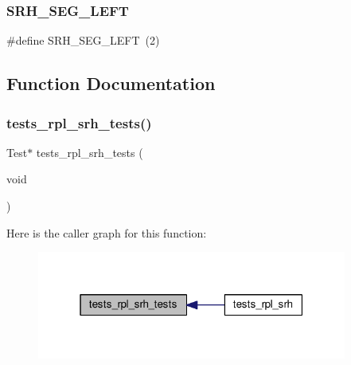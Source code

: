 \subsubsection{\texorpdfstring{S\+R\+H\+\_\+\+S\+E\+G\+\_\+\+L\+E\+FT}{SRH\_SEG\_LEFT}}
{\footnotesize\ttfamily \#define S\+R\+H\+\_\+\+S\+E\+G\+\_\+\+L\+E\+FT~(2)}



\subsection{Function Documentation}
\mbox{\label{tests-rpl__srh_8c_a71bf138551fde46e379e53ce58f01269}} 
\subsubsection{\texorpdfstring{tests\+\_\+rpl\+\_\+srh\+\_\+tests()}{tests\_rpl\_srh\_tests()}}
{\footnotesize\ttfamily Test$\ast$ tests\+\_\+rpl\+\_\+srh\+\_\+tests (\begin{DoxyParamCaption}\item[{void}]{ }\end{DoxyParamCaption})}

Here is the caller graph for this function\+:
\nopagebreak
\begin{figure}[H]
\begin{center}
\leavevmode
\includegraphics[width=289pt]{tests-rpl__srh_8c_a71bf138551fde46e379e53ce58f01269_icgraph}
\end{center}
\end{figure}
